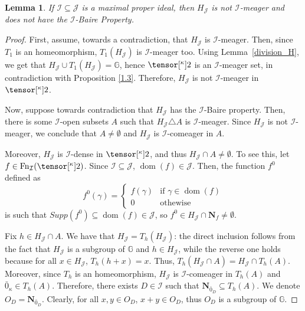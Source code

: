 \documentclass{amsart}
\numberwithin{equation}{section}
\newcommand{\I}{\mathcal{I}}
\newcommand{\pre}[2]{\tensor[^{#1}]{#2}{}}
\newcommand{\Nbhd}{\boldsymbol{N}}
\newcommand{\1}{\mathbf{I}}
\newcommand{\2}{\mathbf{II}}
\newcommand{\g}{\gamma}
\renewcommand{\k}{\kappa}
\DeclareMathOperator{\dom}{dom}
\DeclareMathOperator{\Fn}{Fn}
\newcommand{\clopen}[1]{\Nbhd_{#1}}
\newtheorem{lemma}[theorem]{Lemma}
\theoremstyle{definition}
\theoremstyle{remark}
\begin{document}
\begin{lemma}\label{lemma:withoutBP}
    If $\mathcal{I}\subseteq \mathcal{J}$ is a maximal proper ideal, then $H_\mathcal{J}$ is not $\mathcal{I}$-meager and does not have the $\mathcal{I}$-Baire Property.
\end{lemma}
\begin{proof}
First, assume, towards a contradiction, that $H_\mathcal{J}$ is $\mathcal{I}$-meager. Then, since $T_{1}$ is an homeomorphism, $T_1(H_\mathcal{J})$ is $\mathcal{I}$-meager too. Using Lemma~\ref{division_H}, we get that $H_\mathcal{J}\cup T_1(H_\mathcal{J})=\mathbb G$, hence  $\pre{\k}{2}$ is an $\mathcal{I}$-meager set, in contradiction with Proposition \ref{1.3}. Therefore, $H_\mathcal{J}$ is not $\mathcal{I}$-meager in \(\pre{\k}{2}\).

  Now, suppose towards contradiction that $H_\mathcal{J}$ has the $\mathcal{I}$-Baire property. Then, there is some $\mathcal{I}$-open subsets $A $ such that $H_\mathcal{J}\triangle A$ is \(\I\)-meager. Since $H_\mathcal{J}$ is not \(\I\)-meager, we conclude that $A\neq \emptyset$ and $H_\mathcal{J}$ is $\mathcal{I}$-comeager in $A$. 

Moreover, $H_\mathcal{J}$ is $\mathcal{I}$-dense in \(\pre{\k}{2}\), and thus $H_\mathcal{J}\cap A\neq\emptyset$. To see this, let $f\in \Fn_\I(\pre{\k}{2})$. Since $\mathcal{I}\subseteq \mathcal{J}$, $\dom (f)\in \mathcal{J}$. Then, the function \(f^0\) defined as 
 \[
f^0(\g)= \begin{cases}
  f(\g) & \text{if } \g\in\dom( f)\\
  0 & \text{othewise}
  \end{cases}
\]
is such that $Supp(f^0)\subseteq \dom(f)\in \mathcal{J}$, so $f^0 \in H_\mathcal{J}\cap \clopen{f}\neq \emptyset$.

Fix $h\in H_\mathcal{J}\cap A$. We have that $H_\mathcal{J}= T_h(H_\mathcal{J})$: the direct inclusion follows from the fact that $H_\mathcal{J}$ is a subgroup of \(\mathbb G\) and $h\in H_\mathcal{J}$, while the reverse one holds because for all $x\in H_\mathcal{J}$, $T_h(h+x)=x$.
Thus, $T_h(H_\mathcal{J}\cap A)=H_\mathcal{J} \cap T_h(A)$.
Moreover, since \(T_h\) is an homeomorphism, $H_\mathcal{J}$ is \(\I\)-comeager in $T_h(A)$ and $\bar 0_\kappa\in T_h(A)$. 
Therefore, there exists $D \in \mathcal{I}$ such that $\clopen{\bar 0_D}\subseteq T_h(A)$. We denote \(O_D=\clopen{\bar 0_D}\).
Clearly, for all $x,y \in O_D$, $x+y\in O_D$, thus $O_D$ is a subgroup of $ \mathbb G$.


\end{proof}
\end{document}

